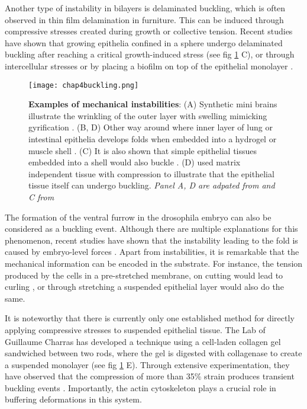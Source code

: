 Another type of instability in bilayers is delaminated buckling, which is often observed in thin film delamination in furniture. This can be induced through compressive stresses created during growth or collective tension. Recent studies have shown that growing epithelia confined in a sphere undergo delaminated buckling after reaching a critical growth-induced stress \cite{trushko2020} (see fig \ref{fig_4_6} C), or through intercellular stresses \cite{oyama2021} or by placing a biofilm on top of the epithelial monolayer \cite{cont2020}.

\begin{figure}
	\centering
	\texttt{[image: chap4buckling.png]}
	\caption{\label{fig_4_6} \textbf{Examples of mechanical instabilities}: (A) Synthetic mini brains illustrate the wrinkling of the outer layer with swelling mimicking gyrification \cite{tallinen2016}. (B, D) Other way around where inner layer of lung or intestinal epithelia develops folds when embedded into a hydrogel or muscle shell \cite{varner2015, shyer2013}. (C) It is also shown that simple epithelial tissues embedded into a shell would also buckle \cite{trushko2020}. (D) \cite{wyatt2020} used matrix independent tissue with compression to illustrate that the epithelial tissue itself can undergo buckling. \textit{Panel A, D are adpated from \cite{collinet2021} and C from \cite{matejcic2020}}
	}
\end{figure}

The formation of the ventral furrow in the drosophila embryo can also be considered as a buckling event. Although there are multiple explanations for this phenomenon, recent studies have shown that the instability leading to the fold is caused by embryo-level forces \cite{guo2022, fierling2022}. Apart from instabilities, it is remarkable that the mechanical information can be encoded in the substrate. For instance, the tension produced by the cells in a pre-stretched membrane, on cutting would lead to curling \cite{tomba2022}, or through stretching a suspended epithelial layer would also do the same\cite{fouchard2020}.

It is noteworthy that there is currently only one established method for directly applying compressive stresses to suspended epithelial tissue. The Lab of Guillaume Charras has developed a technique using a cell-laden collagen gel sandwiched between two rods, where the gel is digested with collagenase to create a suspended monolayer (see fig \ref{fig_4_6} E). Through extensive experimentation, they have observed that the compression of more than 35\% strain produces transient buckling events \cite{wyatt2020}. Importantly, the actin cytoskeleton plays a crucial role in buffering deformations in this system.


